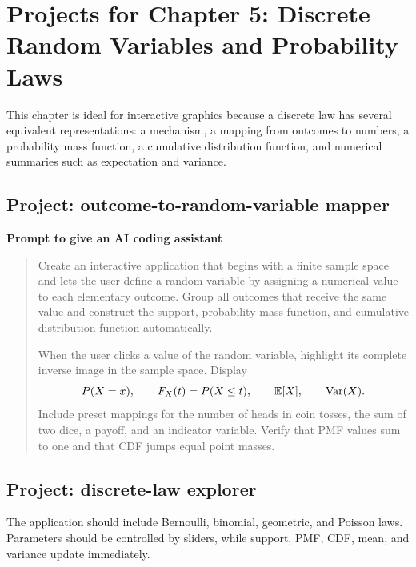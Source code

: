 \section{Projects for Chapter 5: Discrete Random Variables and Probability Laws}

This chapter is ideal for interactive graphics because a discrete law has several equivalent representations: a mechanism, a mapping from outcomes to numbers, a probability mass function, a cumulative distribution function, and numerical summaries such as expectation and variance.

\subsection*{Project: outcome-to-random-variable mapper}

\begin{examplebox}
\textbf{Prompt to give an AI coding assistant}

\begin{quote}\small
Create an interactive application that begins with a finite sample space and lets the user define a random variable by assigning a numerical value to each elementary outcome. Group all outcomes that receive the same value and construct the support, probability mass function, and cumulative distribution function automatically.

When the user clicks a value of the random variable, highlight its complete inverse image in the sample space. Display
\[
P(X=x),\qquad F_X(t)=P(X\leq t),\qquad \mathbb{E}[X],\qquad \operatorname{Var}(X).
\]
Include preset mappings for the number of heads in coin tosses, the sum of two dice, a payoff, and an indicator variable. Verify that PMF values sum to one and that CDF jumps equal point masses.
\end{quote}
\end{examplebox}

\subsection*{Project: discrete-law explorer}

The application should include Bernoulli, binomial, geometric, and Poisson laws. Parameters should be controlled by sliders, while support, PMF, CDF, mean, and variance update immediately.

